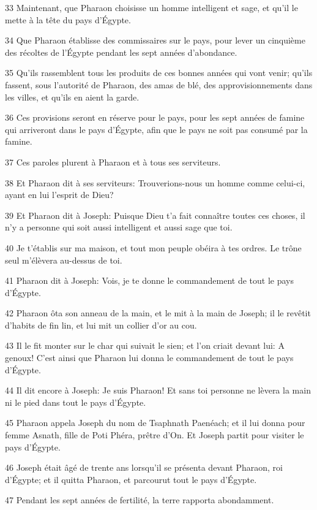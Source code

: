 \par 33 Maintenant, que Pharaon choisisse un homme intelligent et sage, et qu'il le mette à la tête du pays d'Égypte.
\par 34 Que Pharaon établisse des commissaires sur le pays, pour lever un cinquième des récoltes de l'Égypte pendant les sept années d'abondance.
\par 35 Qu'ils rassemblent tous les produits de ces bonnes années qui vont venir; qu'ils fassent, sous l'autorité de Pharaon, des amas de blé, des approvisionnements dans les villes, et qu'ils en aient la garde.
\par 36 Ces provisions seront en réserve pour le pays, pour les sept années de famine qui arriveront dans le pays d'Égypte, afin que le pays ne soit pas consumé par la famine.
\par 37 Ces paroles plurent à Pharaon et à tous ses serviteurs.
\par 38 Et Pharaon dit à ses serviteurs: Trouverions-nous un homme comme celui-ci, ayant en lui l'esprit de Dieu?
\par 39 Et Pharaon dit à Joseph: Puisque Dieu t'a fait connaître toutes ces choses, il n'y a personne qui soit aussi intelligent et aussi sage que toi.
\par 40 Je t'établis sur ma maison, et tout mon peuple obéira à tes ordres. Le trône seul m'élèvera au-dessus de toi.
\par 41 Pharaon dit à Joseph: Vois, je te donne le commandement de tout le pays d'Égypte.
\par 42 Pharaon ôta son anneau de la main, et le mit à la main de Joseph; il le revêtit d'habits de fin lin, et lui mit un collier d'or au cou.
\par 43 Il le fit monter sur le char qui suivait le sien; et l'on criait devant lui: A genoux! C'est ainsi que Pharaon lui donna le commandement de tout le pays d'Égypte.
\par 44 Il dit encore à Joseph: Je suis Pharaon! Et sans toi personne ne lèvera la main ni le pied dans tout le pays d'Égypte.
\par 45 Pharaon appela Joseph du nom de Tsaphnath Paenéach; et il lui donna pour femme Asnath, fille de Poti Phéra, prêtre d'On. Et Joseph partit pour visiter le pays d'Égypte.
\par 46 Joseph était âgé de trente ans lorsqu'il se présenta devant Pharaon, roi d'Égypte; et il quitta Pharaon, et parcourut tout le pays d'Égypte.
\par 47 Pendant les sept années de fertilité, la terre rapporta abondamment.
